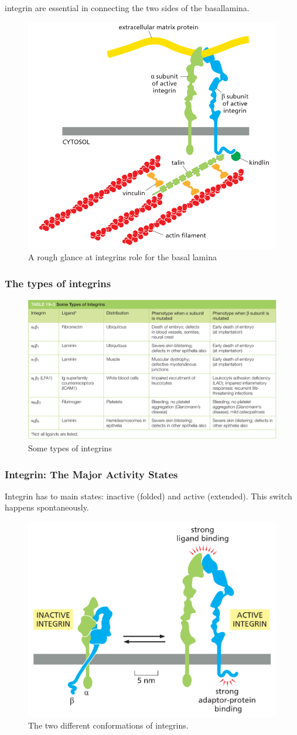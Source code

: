 \documentclass[../main.tex]{subfiles}
\begin{document}
\gls{integrin} are essential in connecting the two sides of the \gls{basallamina}. 
\begin{figure}[H]
	\centering
	\includegraphics[width=0.4\linewidth]{int_roug}
	\caption{A rough glance at integrins role for the basal lamina}
	\label{fig:introug}
\end{figure}


\subsubsection{The types of integrins}

\begin{figure}[H]
	\centering
	\includegraphics[width=0.6\linewidth]{int_type}
	\caption{Some types of integrins}
	\label{fig:inttype}
\end{figure}


\subsubsection{Integrin: The Major Activity States}

Integrin has to main states: inactive (folded) and active (extended). This switch happens spontaneously.
\begin{figure}[H]
	\centering
	\includegraphics[width=0.6\linewidth]{int_conf}
	\caption{The two different conformations of integrins.}
	\label{fig:intconf}
\end{figure}
\end{document}

